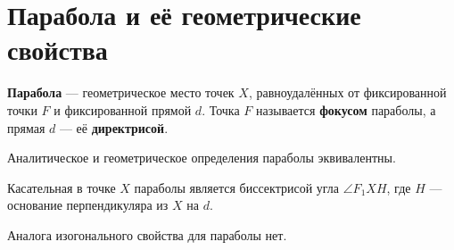 \section{Парабола и её геометрические свойства}

\begin{definition}
    \textbf{Парабола} --- геометрическое место точек $X$, равноудалённых от фиксированной точки $F$ и фиксированной прямой $d$. Точка $F$ называется \textbf{фокусом} параболы, а прямая $d$ --- её \textbf{директрисой}.
\end{definition}

\begin{statement}
    Аналитическое и геометрическое определения параболы эквивалентны.
\end{statement}

\begin{theorem}
    Касательная в точке $X$ параболы является биссектрисой угла $\angle F_1XH$, где $H$ --- основание перпендикуляра из $X$ на $d$.
\end{theorem}

\begin{remark}
    Аналога изогонального свойства для параболы нет.
\end{remark}

